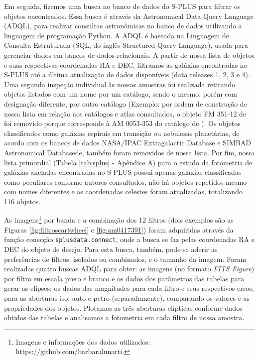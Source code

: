 Em seguida, fizemos uma busca no banco de dados do S-PLUS para filtrar os objetos encontrados. Essa busca é através da Astronomical Data Query Language (ADQL), para realizar consultas astronômicas no banco de dados utilizando a linguagem de programação Python. A ADQL é baseada na Linguagem de Consulta Estruturada (SQL, do inglês Structured Query Language), usada para gerenciar dados em bancos de dados relacionais. A partir de nossa lista de objetos e suas respectivas coordenadas RA e DEC, filtramos as galáxias encontradas no S-PLUS até a última atualização de dados disponíveis (data releases 1, 2, 3 e 4). Uma segunda inspeção individual às nossas amostras foi realizada retirando objetos listados com um nome por um catálogo, sendo o mesmo, porém com designação diferente, por outro catálogo (Exemplo: por ordem de construção de nossa lista em relação aos catálogos e atlas consultados, o objeto FM 351-12 de  foi removido porque corresponde à AM 0053-353 do catálogo de ). Os objetos classificados como galáxias espirais em transição ou nebulosas planetárias, de acordo com os bancos de dados NASA/IPAC Extragalactic Database e SIMBAD Astronomical Databasede, também foram removidos de nossa lista. Por fim, nossa lista primordial (Tabela \ref{tab:splus} - Apêndice A) para o estudo da fotometria de galáxias aneladas encontradas no S-PLUS possui apenas galáxias classificadas como peculiares conforme autores consultados, não há objetos repetidos mesmo com nomes diferentes e as coordenadas celestes foram atualizadas, totalizando 116 objetos.

As imagens\footnote{Imagens e informações dos dados utilizados: https://github.com/barbaralunarti.} por banda e a combinação dos 12 filtros (dois exemplos são as Figuras \ref{fig:filtroscartwheel} e \ref{fig:am0417391}) foram adquiridas através da função conecção \texttt{splusdata.connect}, onde a busca se faz pelas coordenadas RA e DEC do objeto de desejo. Para esta busca, também, pode-se aderir as preferências de filtros, isolados ou combinados, e o tamanho da imagem. Foram realizadas quatro buscas ADQL para obter: as imagens (no formato \emph{FITS Figure}) por filtro em escala preto e branco e os dados dos parâmetros das tabelas para gerar as elipses; os dados das magnitudes para cada filtro e seus respectivos erros, para as aberturas iso, auto e petro (separadamente), comparando os valores e as propriedades dos objetos. Plotamos as três aberturas elípticas conforme dados obtidos das tabelas e analisamos a fotometria em cada filtro de nossa amostra.